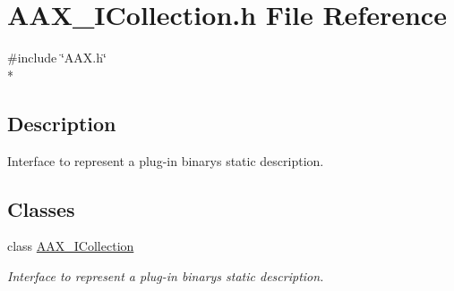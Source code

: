 \hypertarget{a00236}{}\section{A\+A\+X\+\_\+\+I\+Collection.\+h File Reference}
\label{a00236}
{\ttfamily \#include \char`\"{}A\+A\+X.\+h\char`\"{}}\\*


\subsection{Description}
Interface to represent a plug-\/in binary\textquotesingle{}s static description. 

\subsection*{Classes}
\begin{DoxyCompactItemize}
\item 
class \hyperlink{a00087}{A\+A\+X\+\_\+\+I\+Collection}
\begin{DoxyCompactList}\small\item\em Interface to represent a plug-\/in binary\textquotesingle{}s static description. \end{DoxyCompactList}\end{DoxyCompactItemize}
